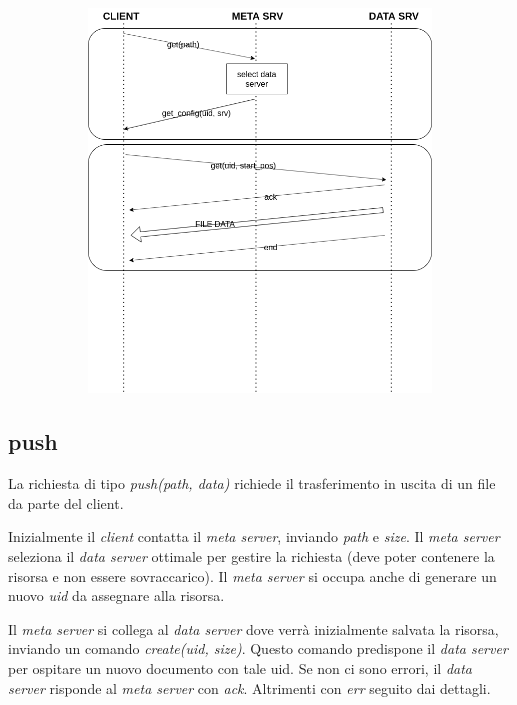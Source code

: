 \documentclass{article}
\begin{document}
\begin{figure}[H]
	\centering
	\begin{subfigure}{0.80\linewidth}
		\includegraphics[width=\linewidth]{../diagrams/requests/get_request.png}
	\end{subfigure}
\end{figure}


\subsection{push}

La richiesta di tipo \textit{push(path, data)} richiede il trasferimento in uscita di un file da parte del client. 

Inizialmente il \textit{client} contatta il \textit{meta server}, inviando \textit{path} e \textit{size}. Il \textit{meta server} seleziona il \textit{data server} ottimale per gestire la richiesta (deve poter contenere la risorsa e non essere sovraccarico). Il \textit{meta server} si occupa anche di generare un nuovo \textit{uid} da assegnare alla risorsa. 

Il \textit{meta server} si collega al \textit{data server} dove verrà inizialmente salvata la risorsa, inviando un comando \textit{create(uid, size)}. Questo comando predispone il \textit{data server} per ospitare un nuovo documento con tale uid. Se non ci sono errori, il \textit{data server} risponde al \textit{meta server} con \textit{ack}. Altrimenti con \textit{err} seguito dai dettagli.
\end{document}
